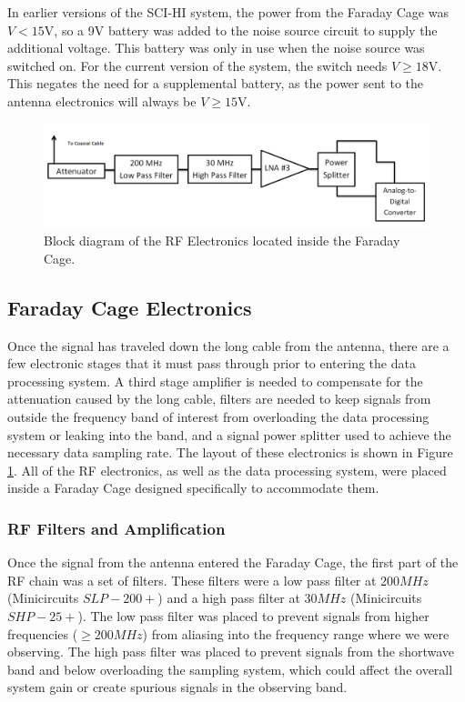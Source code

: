 In earlier versions of the SCI-HI system, the power from the Faraday Cage was $V< 15$V, so a 9V battery was added to the noise source circuit to supply the additional voltage. This battery was only in use when the noise source was switched on. For the current version of the system, the switch needs $V \geq 18$V. This negates the need for a supplemental battery, as the power sent to the antenna electronics will always be $V \geq 15$V.  

\begin{figure}[htb]
\begin{center}
\includegraphics[width=0.9\linewidth]{SCIHI_system/figures/faraday_cage_rf_block_diagram.png}
\caption{Block diagram of the RF Electronics located inside the Faraday Cage.}
\label{Fig:fcage_RF_block_diagram}
\end{center}
\end{figure}


\subsection{Faraday Cage Electronics}

Once the signal has traveled down the long cable from the antenna, there are a few electronic stages that it must pass through prior to entering the data processing system. A third stage amplifier is needed to compensate for the attenuation caused by the long cable, filters are needed to keep signals from outside the frequency band of interest from overloading the data processing system or leaking into the band, and a signal power splitter used to achieve the necessary data sampling rate. The layout of these electronics is shown in Figure \ref{Fig:fcage_RF_block_diagram}. All of the RF electronics, as well as the data processing system, were placed inside a Faraday Cage designed specifically to accommodate them. 

\subsubsection{RF Filters and Amplification} \label{Sec:fcage_elec}

Once the signal from the antenna entered the Faraday Cage, the first part of the RF chain was a set of filters. These filters were a low pass filter at $200 MHz$ (Minicircuits $SLP-200+$) and a high pass filter at $30 MHz$ (Minicircuits $SHP-25+$). The low pass filter was placed to prevent signals from higher frequencies ($\geq 200 MHz$) from aliasing into the frequency range where we were observing. The high pass filter was placed to prevent signals from the shortwave band and below overloading the sampling system, which could affect the overall system gain or create spurious signals in the observing band. 


